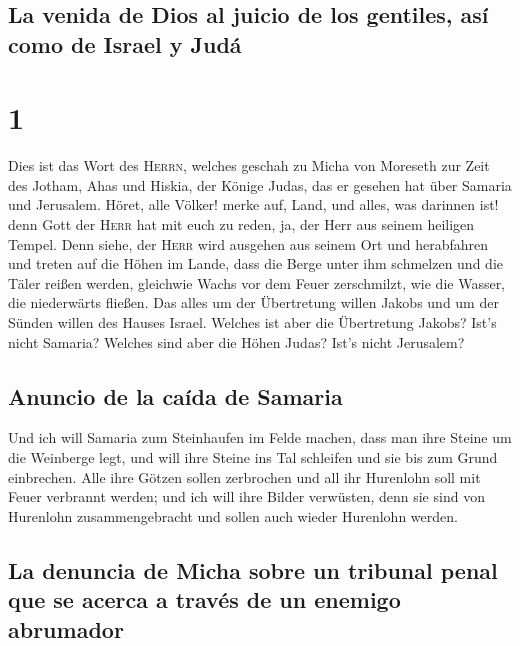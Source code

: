 \hypertarget{la-venida-de-dios-al-juicio-de-los-gentiles-asuxed-como-de-israel-y-juduxe1}{%
\subsection{La venida de Dios al juicio de los gentiles, así como de
Israel y
Judá}\label{la-venida-de-dios-al-juicio-de-los-gentiles-asuxed-como-de-israel-y-juduxe1}}

\hypertarget{section}{%
\section{1}\label{section}}

 Dies ist das Wort des \textsc{Herrn}, welches geschah zu
Micha von Moreseth zur Zeit des Jotham, Ahas und Hiskia, der Könige
Judas, das er gesehen hat über Samaria und Jerusalem. 
Höret, alle Völker! merke auf, Land, und alles, was darinnen ist! denn
Gott der \textsc{Herr} hat mit euch zu reden, ja, der Herr aus seinem
heiligen Tempel.  Denn siehe, der \textsc{Herr} wird
ausgehen aus seinem Ort und herabfahren und treten auf die Höhen im
Lande,  dass die Berge unter ihm schmelzen und die Täler
reißen werden, gleichwie Wachs vor dem Feuer zerschmilzt, wie die
Wasser, die niederwärts fließen.  Das alles um der
Übertretung willen Jakobs und um der Sünden willen des Hauses Israel.
Welches ist aber die Übertretung Jakobs? Ist's nicht Samaria? Welches
sind aber die Höhen Judas? Ist's nicht Jerusalem?

\hypertarget{anuncio-de-la-cauxedda-de-samaria}{%
\subsection{Anuncio de la caída de
Samaria}\label{anuncio-de-la-cauxedda-de-samaria}}

 Und ich will Samaria zum Steinhaufen im Felde machen,
dass man ihre Steine um die Weinberge legt, und will ihre Steine ins Tal
schleifen und sie bis zum Grund einbrechen.  Alle ihre
Götzen sollen zerbrochen und all ihr Hurenlohn soll mit Feuer verbrannt
werden; und ich will ihre Bilder verwüsten, denn sie sind von Hurenlohn
zusammengebracht und sollen auch wieder Hurenlohn werden.

\hypertarget{la-denuncia-de-micha-sobre-un-tribunal-penal-que-se-acerca-a-travuxe9s-de-un-enemigo-abrumador}{%
\subsection{La denuncia de Micha sobre un tribunal penal que se acerca a
través de un enemigo
abrumador}\label{la-denuncia-de-micha-sobre-un-tribunal-penal-que-se-acerca-a-travuxe9s-de-un-enemigo-abrumador}}

